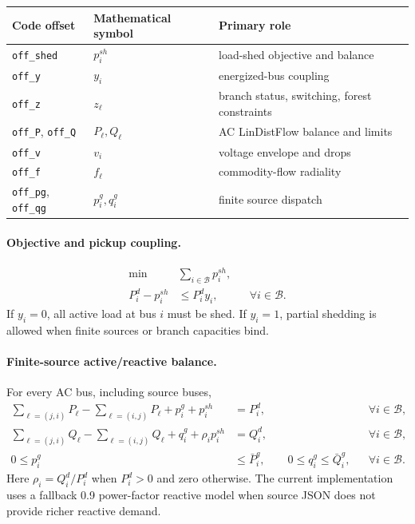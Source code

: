 \begin{center}
\begin{tabular}{lll}
\hline
Code offset & Mathematical symbol & Primary role \\
\hline
\texttt{off\_shed} & $p^{sh}_i$ & load-shed objective and balance \\
\texttt{off\_y} & $y_i$ & energized-bus coupling \\
\texttt{off\_z} & $z_\ell$ & branch status, switching, forest constraints \\
\texttt{off\_P}, \texttt{off\_Q} & $P_\ell,Q_\ell$ & AC LinDistFlow balance and limits \\
\texttt{off\_v} & $v_i$ & voltage envelope and drops \\
\texttt{off\_f} & $f_\ell$ & commodity-flow radiality \\
\texttt{off\_pg}, \texttt{off\_qg} & $p^g_i,q^g_i$ & finite source dispatch \\
\hline
\end{tabular}
\end{center}

\paragraph{Objective and pickup coupling.}
\begin{align}
\min \quad & \sum_{i\in\mathcal{B}} p^{sh}_i ,
  \label{eq:cxx-3stage-obj}\\
P^d_i - p^{sh}_i &\le P^d_i y_i,
  && \forall i\in\mathcal{B}. \label{eq:cxx-energized-load}
\end{align}
If $y_i=0$, all active load at bus $i$ must be shed.  If $y_i=1$, partial
shedding is allowed when finite sources or branch capacities bind.

\paragraph{Finite-source active/reactive balance.}
For every AC bus, including source buses,
\begin{align}
\sum_{\ell=(j,i)} P_\ell - \sum_{\ell=(i,j)} P_\ell + p^g_i + p^{sh}_i
  &= P^d_i, && \forall i\in\mathcal{B}, \label{eq:cxx-p-balance}\\
\sum_{\ell=(j,i)} Q_\ell - \sum_{\ell=(i,j)} Q_\ell + q^g_i
  + \rho_i p^{sh}_i &= Q^d_i,
  && \forall i\in\mathcal{B}, \label{eq:cxx-q-balance}\\
0 \le p^g_i &\le \bar P^g_i, \qquad
0 \le q^g_i \le \bar Q^g_i,
  && \forall i\in\mathcal{B}. \label{eq:cxx-source-bounds}
\end{align}
Here $\rho_i=Q^d_i/P^d_i$ when $P^d_i>0$ and zero otherwise.  The current
implementation uses a fallback 0.9 power-factor reactive model when source JSON
does not provide richer reactive demand.

